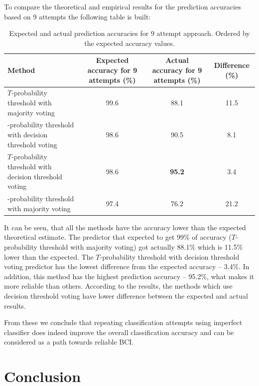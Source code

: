 \documentclass[12pt]{article}
\theoremstyle{definition}
\begin{document}
To compare the theoretical and empirical results for the prediction accuracies based on 9 attempts the following table is built:
\begin{table}[H]
\begin{center}
  \begin{tabular}{ | l | c | c | c | }
    \hline
    Method &\parbox[c]{1.8cm}{\raggedright Expected accuracy for 9 attempts (\%)} &\parbox[c]{1.8cm}{\raggedright Actual accuracy for 9 attempts (\%)} &\parbox[c]{1.8cm}{\raggedright Difference (\%)}\\ \hline
    \parbox[c]{7cm}{\raggedright $T$-probability threshold with majority voting} & 99.6 & 88.1 & 11.5 \\ \hline
    \parbox[c]{7cm}{-probability threshold with decision threshold voting} & 98.6 & 90.5 & 8.1 \\ \hline
	\parbox[c]{7cm}{$T$-probability threshold with decision threshold voting} & 98.6 & \textbf{95.2} & 3.4\\ \hline
	\parbox[c]{7cm}{-probability threshold with majority voting} & 97.4 & 76.2 & 21.2\\ \hline
  \end{tabular}
\end{center}
\caption{Expected and actual prediction accuracies for 9 attempt approach. Ordered by the expected accuracy values.}
\end{table}

It can be seen, that all the methods have the accuracy lower than the expected theoretical estimate. The predictor that expected to get 99\% of accuracy ($T$-probability threshold with majority voting) got actually 88.1\% which is 11.5\% lower than the expected. The $T$-probability threshold with decision threshold voting predictor has the lowest difference from the expected accuracy -- 3.4\%. In addition, this method has the highest prediction accuracy -- 95.2\%, what makes it more reliable than others. According to the results, the methods which use decision threshold voting have lower difference between the expected and actual results.

From these we conclude that repeating classification attempts using imperfect classifier does indeed improve the overall classification accuracy and can be considered as a path towards reliable BCI.

\newpage
\section*{Conclusion}
\end{document}
